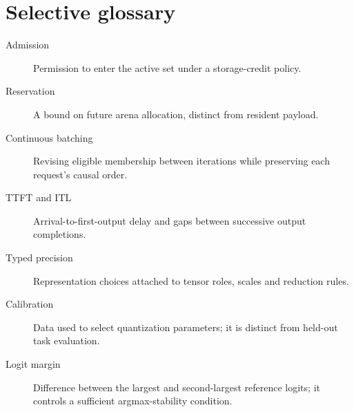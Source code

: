 \section{Selective glossary}
\begin{description}
\item[Admission] Permission to enter the active set under a storage-credit policy.
\item[Reservation] A bound on future arena allocation, distinct from resident payload.
\item[Continuous batching] Revising eligible membership between iterations while preserving each request's causal order.
\item[TTFT and ITL] Arrival-to-first-output delay and gaps between successive output completions.
\item[Typed precision] Representation choices attached to tensor roles, scales and reduction rules.
\item[Calibration] Data used to select quantization parameters; it is distinct from held-out task evaluation.
\item[Logit margin] Difference between the largest and second-largest reference logits; it controls a sufficient argmax-stability condition.
\end{description}

